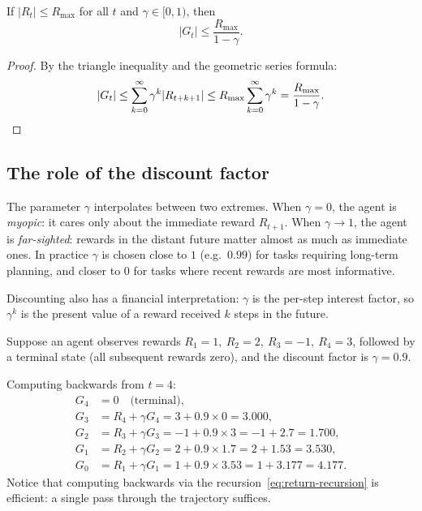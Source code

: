 \begin{proposition}
\label{prop:bounded-return}
If $|R_t| \le R_{\max}$ for all $t$ and $\gamma \in [0, 1)$, then
\begin{equation}
\label{eq:bounded-return}
|G_t| \le \frac{R_{\max}}{1 - \gamma}.
\end{equation}
\end{proposition}

\begin{proof}
By the triangle inequality and the geometric series formula:
\[
|G_t| \le \sum_{k=0}^{\infty} \gamma^k |R_{t+k+1}|
         \le R_{\max} \sum_{k=0}^{\infty} \gamma^k
         = \frac{R_{\max}}{1-\gamma}. \qedhere
\]
\end{proof}

\subsection*{The role of the discount factor}

The parameter $\gamma$ interpolates between two extremes. When $\gamma = 0$, the agent is \emph{myopic}: it cares only about the immediate reward $R_{t+1}$. When $\gamma \to 1$, the agent is \emph{far-sighted}: rewards in the distant future matter almost as much as immediate ones. In practice $\gamma$ is chosen close to $1$ (e.g.\ $0.99$) for tasks requiring long-term planning, and closer to $0$ for tasks where recent rewards are most informative.

Discounting also has a financial interpretation: $\gamma$ is the per-step interest factor, so $\gamma^k$ is the present value of a reward received $k$ steps in the future.

\begin{example}
\label{ex:return-calc}
Suppose an agent observes rewards $R_1 = 1,\ R_2 = 2,\ R_3 = -1,\ R_4 = 3$, followed by a terminal state (all subsequent rewards zero), and the discount factor is $\gamma = 0.9$.

Computing backwards from $t = 4$:
\begin{align*}
G_4 &= 0 \quad \text{(terminal)}, \\
G_3 &= R_4 + \gamma G_4 = 3 + 0.9 \times 0 = 3.000, \\
G_2 &= R_3 + \gamma G_3 = -1 + 0.9 \times 3 = -1 + 2.7 = 1.700, \\
G_1 &= R_2 + \gamma G_2 = 2 + 0.9 \times 1.7 = 2 + 1.53 = 3.530, \\
G_0 &= R_1 + \gamma G_1 = 1 + 0.9 \times 3.53 = 1 + 3.177 = 4.177.
\end{align*}
Notice that computing backwards via the recursion~\eqref{eq:return-recursion} is efficient: a single pass through the trajectory suffices.
\end{example}


